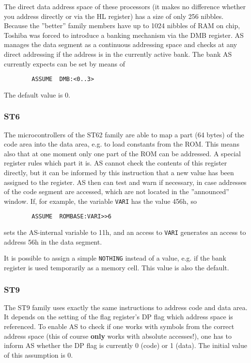 \documentclass[12pt,twoside]{report}
\newcommand{\bb}[1]{{\bf #1}}
\newcommand{\tty}[1]{{\tt #1}}
\begin{document}
The direct data address space of these processors (it makes no
difference whether you address directly or via the HL register) has a
size of only 256 nibbles.  Because the ''better'' family members have
up to 1024 nibbles of RAM on chip, Toshiba was forced to introduce a
banking mechanism via the DMB register.  AS manages the data segment
as a continuous addressing space and checks at any direct addressing
if the address is in the currently active bank.  The bank AS
currently expects can be set by means of
\begin{verbatim}
        ASSUME  DMB:<0..3>
\end{verbatim}
The default value is 0.


\subsubsection{ST6}
\label{ST6Assume}

The microcontrollers of the ST62 family are able to map a part (64 bytes)
of the code area into the data area, e.g. to load constants from the ROM. 
This means also that at one moment only one part of the ROM can be
addressed.  A special register rules which part it is.  AS cannot check
the contents of this register directly, but it can be informed by this
instruction that a new value has been assigned to the register.  AS then
can test and warn if necessary, in case addresses of the code segment are
accessed, which are not located in the ''announced'' window.  If, for
example, the variable \tty{VARI} has the value 456h, so
\begin{verbatim}
        ASSUME  ROMBASE:VARI>>6
\end{verbatim}
sets the AS-internal variable to 11h, and an access to \tty{VARI}
generates an access to address 56h in the data segment.

It is possible to assign a simple \tty{NOTHING} instead of a value, e.g.
if the bank register is used temporarily as a memory cell.  This value is
also the default.


\subsubsection{ST9}

The ST9 family uses exactly the same instructions to address code and
data area.  It depends on the setting of the flag register's DP flag
which address space is referenced.  To enable AS to check if one
works with symbols from the correct address space (this of course
\bb{only} works with absolute accesses!), one has to inform AS whether the
DP flag is currently 0 (code) or 1 (data).  The initial value of this
assumption is 0.
\end{document}
